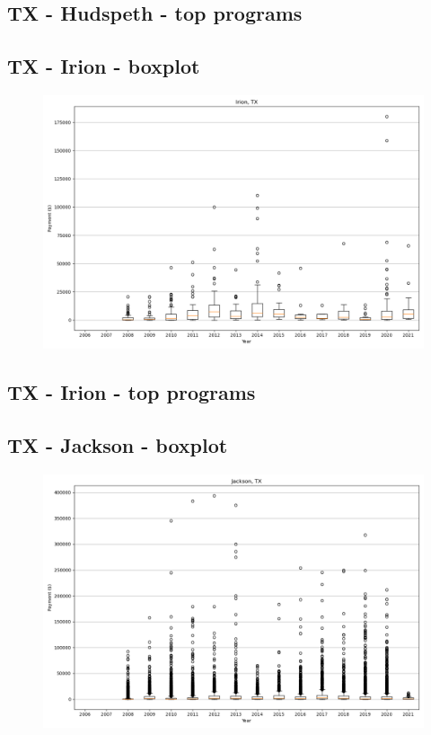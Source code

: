 \subsection*{TX - Hudspeth - top programs}

\newpage
\subsection*{TX - Irion - boxplot}
\begin{figure}[h]
\centering
\includegraphics[width=7in]{../output/boxplots/counties/Irion-TX_boxplot.png}
\end{figure}


\subsection*{TX - Irion - top programs}

\newpage
\subsection*{TX - Jackson - boxplot}
\begin{figure}[h]
\centering
\includegraphics[width=7in]{../output/boxplots/counties/Jackson-TX_boxplot.png}
\end{figure}



